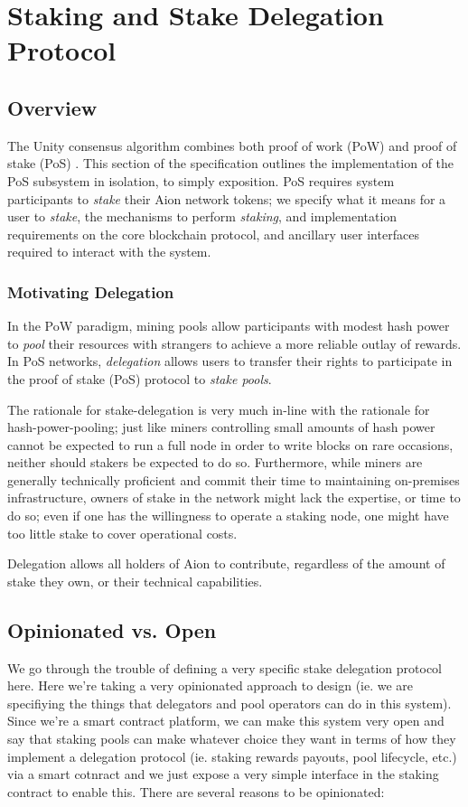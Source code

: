 \section{Staking and Stake Delegation Protocol}

\subsection{Overview}
The Unity consensus algorithm combines both proof of work (PoW) and proof of stake (PoS) \cite{WZS19}. This section of the specification outlines the implementation of the PoS subsystem in isolation, to simply exposition. PoS requires system participants to \textit{stake} their Aion network tokens; we specify what it means for a user to \textit{stake}, the mechanisms to perform \textit{staking}, and implementation requirements on the core blockchain protocol, and ancillary user interfaces required to interact with the system. 

\subsubsection{Motivating Delegation}
In the PoW paradigm, mining pools allow participants with modest hash power to \textit{pool} their resources with strangers to achieve a more reliable outlay of rewards. In PoS networks, \textit{delegation} allows users to transfer their rights to participate in the proof of stake (PoS) protocol to \textit{stake pools}. 

The rationale for stake-delegation is very much in-line with the rationale for hash-power-pooling; just like miners controlling small amounts of hash power cannot be expected to run a full node in order to write blocks on rare occasions, neither should stakers be expected to do so. Furthermore, while miners are generally technically proficient and commit their time to maintaining on-premises infrastructure, owners of stake in the network might lack the expertise, or time to do so; even if one has the willingness to operate a staking node, one might have too little stake to cover operational costs. 

Delegation allows all holders of Aion to contribute, regardless of the amount of stake they own, or their technical capabilities.

\subsection{Opinionated vs. Open}
We go through the trouble of defining a very specific stake delegation protocol here. Here we're taking a very opinionated approach to design (ie. we are specifiying the things that delegators and pool operators can do in this system). Since we're a smart contract platform, we can make this system very open and say that staking pools can make whatever choice they want in terms of how they implement a delegation protocol (ie. staking rewards payouts, pool lifecycle, etc.) via a smart cotnract and we just expose a very simple interface in the staking contract to enable this. There are several reasons to be opinionated: 

